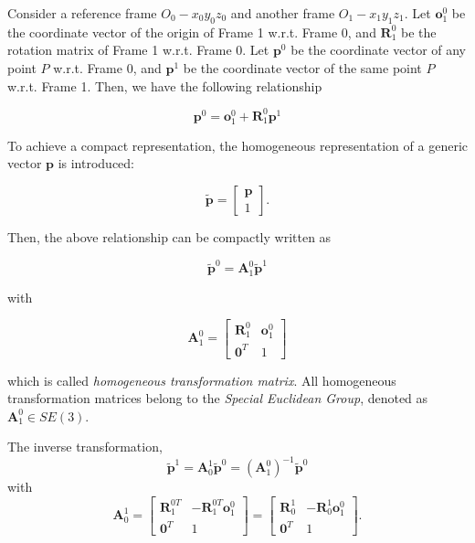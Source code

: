 \documentclass[10pt]{article}
\begin{document}
Consider a reference frame $O_{0}- x_{0} y_{0} z_{0}$ and another frame  $O_{1}- x_{1} y_{1} z_{1}$. Let $\boldsymbol{o}_{1}^{0}$ be the coordinate vector of the origin of Frame 1 w.r.t. Frame 0, and $\boldsymbol{R}_{1}^{0}$ be the rotation matrix of Frame 1 w.r.t. Frame 0. Let $\boldsymbol{p}^{0}$ be the coordinate vector of any point $P$ w.r.t. Frame 0, and $\boldsymbol{p}^{1}$ be the coordinate vector of the same point $P$ w.r.t. Frame 1. Then, we have the following relationship

$$
\boldsymbol{p}^{0}=\boldsymbol{o}_{1}^{0}+\boldsymbol{R}_{1}^{0} \boldsymbol{p}^{1}
$$



To achieve a compact representation, the homogeneous representation of a generic vector $\boldsymbol{p}$ is introduced:

$$
\widetilde{\boldsymbol{p}}=\left[\begin{array}{l}
\boldsymbol{p} \\
1
\end{array}\right] .
$$

Then, the above relationship can be compactly written as 

$$
\widetilde{\boldsymbol{p}}^{0}=\boldsymbol{A}_{1}^{0} \widetilde{\boldsymbol{p}}^{1}
$$

with 

$$
\boldsymbol{A}_{1}^{0}=\left[\begin{array}{cc}
\boldsymbol{R}_{1}^{0} & \boldsymbol{o}_{1}^{0} \\
\mathbf{0}^{T} & 1
\end{array}\right]
$$

which is called \emph{homogeneous transformation matrix}. All homogeneous transformation matrices belong to the \emph{Special Euclidean Group}, denoted as  $\boldsymbol{A}_{1}^{0}\in SE(3)$.

\smallskip
\noindent
The inverse transformation, 
$$
\widetilde{\boldsymbol{p}}^{1}=\boldsymbol{A}_{0}^{1} \widetilde{\boldsymbol{p}}^{0}=\left(\boldsymbol{A}_{1}^{0}\right)^{-1} \widetilde{\boldsymbol{p}}^{0}
$$
with
$$
\boldsymbol{A}_{0}^{1}=\left[\begin{array}{cc}
\boldsymbol{R}_{1}^{0 T} & -\boldsymbol{R}_{1}^{0 T} \boldsymbol{o}_{1}^{0} \\
\mathbf{0}^{T} & 1
\end{array}\right]=\left[\begin{array}{cc}
\boldsymbol{R}_{0}^{1} & -\boldsymbol{R}_{0}^{1} \boldsymbol{o}_{1}^{0} \\
\mathbf{0}^{T} & 1
\end{array}\right].
$$
\end{document}
